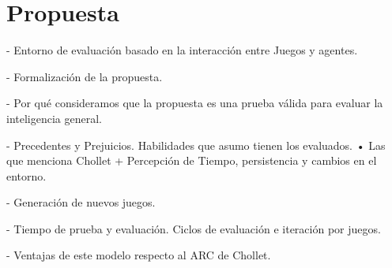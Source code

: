 \chapter{Propuesta}\label{chapter:proposal}

- Entorno de evaluación basado en la interacción entre Juegos y agentes.

- Formalización de la propuesta. 

- Por qué consideramos que la propuesta es una prueba válida para evaluar la inteligencia general.

- Precedentes y Prejuicios. Habilidades que asumo tienen los evaluados.
• Las que menciona Chollet
+ Percepción de Tiempo, persistencia y cambios en el entorno.

- Generación de nuevos juegos.

- Tiempo de prueba y evaluación. Ciclos de evaluación e iteración por juegos.

- Ventajas de este modelo respecto al ARC de Chollet.